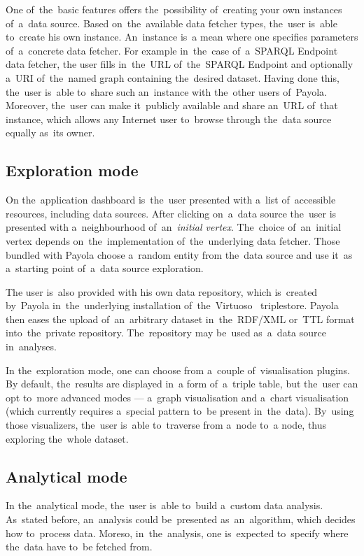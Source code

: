One of~the~basic features offers the~possibility of~creating your own instances of~a~data source. Based on~the~available data fetcher types, the~user is~able to~create 
his own instance. An~instance is~a mean where one specifies parameters of~a~concrete data fetcher. For example in~the~case of~a~SPARQL Endpoint data fetcher,
the user fills in~the~URL of~the~SPARQL Endpoint and optionally a~URI of~the~named graph 
containing the~desired dataset. Having done this, the~user is~able to~share 
such an~instance with the~other users of~Payola.
Moreover, the~user can make it~publicly available and share an~URL of~that instance, which allows any 
Internet user to~browse through the~data source equally as~its owner.

\subsection{Exploration mode}
On the~application dashboard is~the~user presented with a~list of~accessible 
resources, including data sources. After clicking on~a~data source the~user is
presented with a~neighbourhood of~an~\emph{initial vertex}. The~choice of~an~initial vertex
depends on~the~implementation of~the~underlying data fetcher.
Those bundled with Payola choose a~random entity from the~data source
and use it~as a~starting point of~a~data source exploration.

The user is~also provided with his own data repository, which is~created by~Payola in~the~underlying installation of~the~Virtuoso~\cite{virtuoso} triplestore. Payola then eases 
the upload of~an~arbitrary dataset in~the~RDF/XML or~TTL 
format into~the~private repository. The~repository may be~used as~a~data source in~analyses.

In the~exploration mode, one can choose from a~couple of~visualisation plugins. 
By default, the~results are displayed in~a form of~a~triple table, but the~user can 
opt to~more advanced modes --- a~graph visualisation and a~chart visualisation
(which currently requires a~special pattern to~be present in~the~data). By~using those 
visualizers, the~user is~able to~traverse from a~node to~a node, thus exploring the~whole 
dataset.

\subsection{Analytical mode}
In the~analytical mode, the~user is~able to~build a~custom data analysis. As~stated before, an~analysis could be~presented as~an~algorithm, which decides 
how to~process data. Moreso, in~the~analysis, one is~expected to~specify 
where the~data have to~be fetched from.

